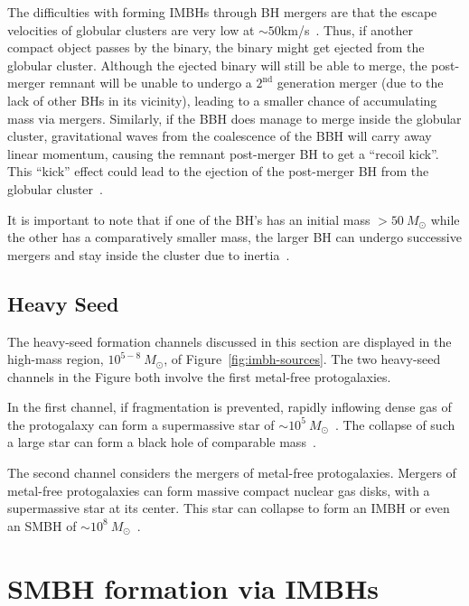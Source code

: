 The difficulties with forming IMBHs through BH mergers are that the
escape velocities of globular clusters are very low at $\sim50$km/s~\cite{morscher2013retention}. 
Thus, if another compact object passes by the binary, the binary might get ejected from the globular cluster.
Although the ejected binary will still be able to merge, the post-merger remnant will be unable to undergo a $2^{\text{nd}}$ generation merger (due to the lack of other BHs in its vicinity), leading to a smaller chance of accumulating mass via mergers.  
Similarly, if the BBH does manage to merge inside the globular cluster, gravitational waves from the coalescence of the BBH  will carry away linear momentum, causing the remnant post-merger BH to get a ``recoil kick''. 
This ``kick'' effect could lead to the ejection of the post-merger BH from the globular cluster~\cite{favata2004black}.

It is important to note that if one of the BH's has an initial mass $>50 \ M_{\odot}$ while the other has a comparatively smaller mass, the larger BH can undergo successive mergers and stay inside the cluster due to inertia~\cite{coleman2002production}.



\subsection{Heavy Seed}

The heavy-seed formation channels discussed in this section are
displayed in the high-mass region, $10^{5-8} \ M_{\odot}$, of
Figure~\ref{fig:imbh-sources}. 
The two heavy-seed channels in the Figure both involve the first metal-free protogalaxies.

In the first channel, if fragmentation is prevented, rapidly inflowing dense gas of the protogalaxy can form a supermassive star of  $\sim10^{5} \ M_{\odot}$~\cite{regan2014direct}. 
The collapse of such a large star can form a black hole of comparable mass~\cite{regan2014direct}.

The second channel considers the mergers of metal-free protogalaxies.
Mergers of metal-free protogalaxies can form massive compact nuclear
gas disks, with a supermassive star at its center. This star can
collapse to form an IMBH or even an SMBH of  $\sim10^{8} \
M_{\odot}$~\cite{mezcua2017observational}.


\section{SMBH formation via IMBHs}


